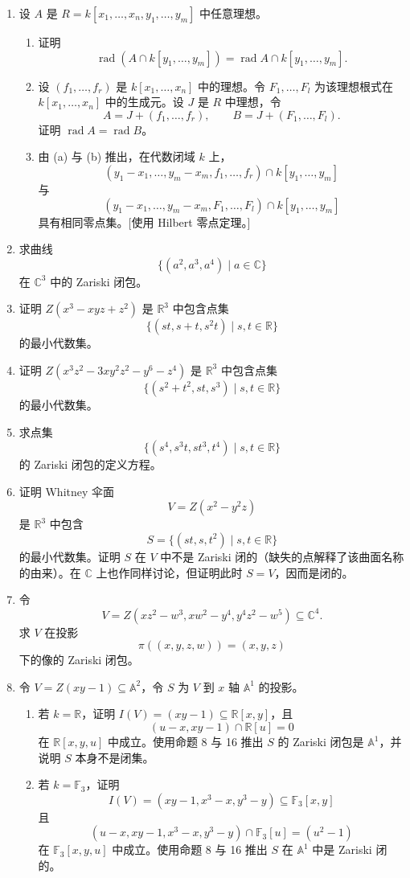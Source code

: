 \begin{enumerate}[label=\arabic*.]
	\item 设 $A$ 是 $R=k[x_1,
	\ldots,x_n,y_1,
	\ldots,y_m]$ 中任意理想。
	\begin{enumerate}[label=(\alph*)]
		\item 证明
		\[
		\operatorname{rad}(A\cap k[y_1,
		\ldots,y_m])=\operatorname{rad}A\cap k[y_1,
		\ldots,y_m].
		\]
		\item 设 $(f_1,
		\ldots,f_r)$ 是 $k[x_1,
		\ldots,x_n]$ 中的理想。令 $F_1,
		\ldots,F_l$ 为该理想根式在 $k[x_1,
		\ldots,x_n]$ 中的生成元。设 $J$ 是 $R$ 中理想，令
		\[
		A=J+(f_1,
		\ldots,f_r),
		\qquad
		B=J+(F_1,
		\ldots,F_l).
		\]
		证明 $\operatorname{rad}A=\operatorname{rad}B$。
		\item 由 (a) 与 (b) 推出，在代数闭域 $k$ 上，
		\[
		(y_1-x_1,
		\ldots,y_m-x_m,f_1,
		\ldots,f_r)\cap k[y_1,
		\ldots,y_m]
		\]
		与
		\[
		(y_1-x_1,
		\ldots,y_m-x_m,F_1,
		\ldots,F_l)\cap k[y_1,
		\ldots,y_m]
		\]
		具有相同零点集。[使用 Hilbert 零点定理。]
	\end{enumerate}
	
	\item 求曲线
	\[
	\{(a^2,a^3,a^4)\mid a\in\mathbb C\}
	\]
	在 $\mathbb C^3$ 中的 Zariski 闭包。
	
	\item 证明 $Z(x^3-xyz+z^2)$ 是 $\mathbb R^3$ 中包含点集
	\[
	\{(st,
	s+t,
	s^2t)\mid s,t\in\mathbb R\}
	\]
	的最小代数集。
	
	\item 证明 $Z(x^3z^2-3xy^2z^2-y^6-z^4)$ 是 $\mathbb R^3$ 中包含点集
	\[
	\{(s^2+t^2,
	st,
	s^3)\mid s,t\in\mathbb R\}
	\]
	的最小代数集。
	
	\item 求点集
	\[
	\{(s^4,
	s^3t,
	st^3,
	t^4)\mid s,t\in\mathbb R\}
	\]
	的 Zariski 闭包的定义方程。
	
	\item 证明 Whitney 伞面
	\[
	V=Z(x^2-y^2z)
	\]
	是 $\mathbb R^3$ 中包含
	\[
	S=\{(st,
	s,
	t^2)\mid s,t\in\mathbb R\}
	\]
	的最小代数集。证明 $S$ 在 $V$ 中不是 Zariski 闭的（缺失的点解释了该曲面名称的由来）。在 $\mathbb C$ 上也作同样讨论，但证明此时 $S=V$，因而是闭的。
	
	\item 令
	\[
	V=Z(xz^2-w^3,
	xw^2-y^4,
	y^4z^2-w^5)\subseteq\mathbb C^4.
	\]
	求 $V$ 在投影
	\[
	\pi((x,y,z,w))=(x,y,z)
	\]
	下的像的 Zariski 闭包。
	
	\item 令 $V=Z(xy-1)\subseteq\mathbb A^2$，令 $S$ 为 $V$ 到 $x$ 轴 $\mathbb A^1$ 的投影。
	\begin{enumerate}[label=(\alph*)]
		\item 若 $k=\mathbb R$，证明 $I(V)=(xy-1)\subseteq\mathbb R[x,y]$，且
		\[
		(u-x,xy-1)\cap\mathbb R[u]=0
		\]
		在 $\mathbb R[x,y,u]$ 中成立。使用命题 8 与 16 推出 $S$ 的 Zariski 闭包是 $\mathbb A^1$，并说明 $S$ 本身不是闭集。
		\item 若 $k=\mathbb F_3$，证明
		\[
		I(V)=(xy-1,
		x^3-x,
		y^3-y)\subseteq\mathbb F_3[x,y]
		\]
		且
		\[
		(u-x,
		xy-1,
		x^3-x,
		y^3-y)\cap\mathbb F_3[u]=(u^2-1)
		\]
		在 $\mathbb F_3[x,y,u]$ 中成立。使用命题 8 与 16 推出 $S$ 在 $\mathbb A^1$ 中是 Zariski 闭的。
	\end{enumerate}
	

\end{enumerate}
